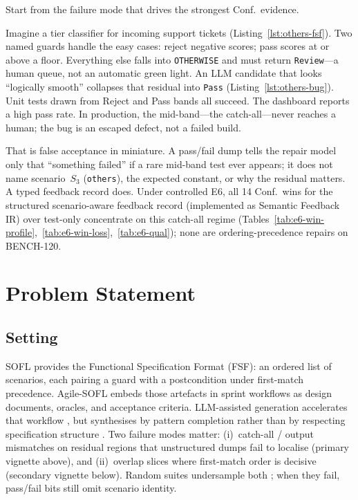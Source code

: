 Start from the failure mode that drives the strongest Conf.\ evidence.

Imagine a tier classifier for incoming support tickets
(Listing~\ref{lst:others-fsf}).
Two named guards handle the easy cases: reject negative scores; pass scores at
or above a floor.
Everything else falls into \texttt{OTHERWISE} and must return
\texttt{Review}---a human queue, not an automatic green light.
An LLM candidate that looks ``logically smooth'' collapses that residual into
\texttt{Pass} (Listing~\ref{lst:others-bug}).
Unit tests drawn from Reject and Pass bands all succeed.
The dashboard reports a high pass rate.
In production, the mid-band---the catch-all---never reaches a human; the bug
is an escaped defect, not a failed build.

That is false acceptance in miniature.
A pass/fail dump tells the repair model only that ``something failed'' if a
rare mid-band test ever appears; it does not name scenario~$S_3$
(\texttt{others}), the expected constant, or why the residual matters.
A typed feedback record does.
Under controlled E6, all 14 Conf.\ wins for the structured scenario-aware
feedback record (implemented as Semantic Feedback IR) over
test-only concentrate on this catch-all regime
(Tables~\ref{tab:e6-win-profile},~\ref{tab:e6-win-loss},~\ref{tab:e6-qual});
none are ordering-precedence repairs on BENCH-120.



\section{Problem Statement}
\label{sec:intro:problem}

\subsection{Setting}
SOFL \citep{liu1998sofl,liu2004soflbook} provides the Functional Specification
Format (FSF): an ordered list of scenarios, each pairing a guard with a
postcondition under first-match precedence.
Agile-SOFL \citep{li2022qrs_companion} embeds those artefacts in sprint
workflows as design documents, oracles, and acceptance criteria.
LLM-assisted generation accelerates that workflow
\cite{chen2021codex,openai2023gpt4}, but synthesises by pattern completion
rather than by respecting specification structure
\cite{dakhel2023copilot,sun2024clover}.
Two failure modes matter: (i)~catch-all / output mismatches on residual
regions that unstructured dumps fail to localise (primary vignette above),
and (ii)~overlap slices where first-match order is decisive (secondary
vignette below).
Random suites undersample both \citep{zhu1997specification}; when they fail,
pass/fail bits still omit scenario identity.

